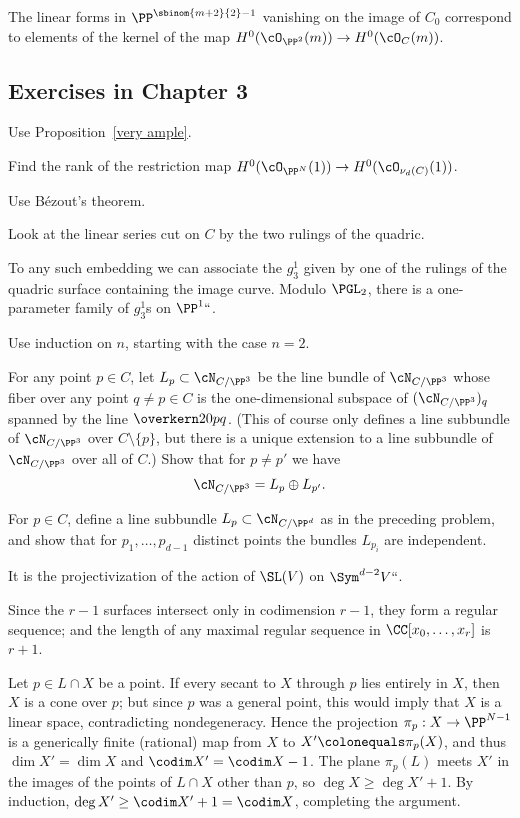 The linear forms in $\PP^{\sbinom{m+2}{2} - 1}$ vanishing on the image
of $C_0$ correspond to elements of the kernel of the map
$H^0(\cO_{\PP^2}(m)) \to H^0(\cO_{C}(m))$.

\subsection*{Exercises in Chapter 3}

Use Proposition~\ref{very ample}.

Find the rank of the restriction map
$H^0(\cO_{\PP^N}(1)) \to H^0(\cO_{\nu_d(C)}(1))$.

Use B\'ezout's theorem.
%

Look at the linear series cut on $C$ by the two rulings of the quadric.

To any such embedding we can associate the $g^1_3$ given by one of the
rulings of the quadric surface containing the image curve. Modulo
$\PGL_2$, there is a one-parameter family of $g^1_3$s on $\PP^1` `$.

 Use induction on $n$, starting with the case $n=2$.

 For any point $p \in C$, let $L_p \subset \cN_{C/\PP^3}$ be the
%
line bundle
of $\cN_{C/\PP^3}$ whose fiber over any point $q \neq p \in C$ is the
one-dimensional subspace of $(\cN_{C/\PP^3})_q$ spanned by the line
$\overkern20{pq}$. (This of course only defines a line subbundle of
$\cN_{C/\PP^3}$ over $C \setminus \{p\}$, but there is a unique
extension to a line subbundle of $\cN_{C/\PP^3}$ over all of $C$.)
Show that for $p \neq p'$ we have
$$
\cN_{C/\PP^3} = L_p \oplus L_{p'}.
$$

For $p \in C$, define a line subbundle $L_p \subset \cN_{C/\PP^d}$ as
in the preceding problem, and show that for $p_1,\dots,p_{d-1}$
distinct points the bundles $L_{p_i}$ are independent.

It is the projectivization of the action of $\SL(V)$ on $\Sym^{d-2}V` `$.

Since the $r-1$ surfaces intersect only in codimension $r-1$, they form
a regular sequence; and the length of any maximal regular sequence in
$\CC[x_0,\dots, x_r]$ is $r+1$.

 Let $p\in L\cap X$ be a point. If every secant to $X$ through
$p$ lies entirely in $X$, then $X$ is a cone over $p$; but since $p$
was a general point, this would imply that $X$ is a linear space,
contradicting nondegeneracy.
Hence
the projection $\pi_{p}:X \to \PP^{N-1}$ is a generically
finite (rational) map from $X$ to $X' \colonequals  \pi_{p}(X)$,
and thus $\dim X' = \dim X$ and $\codim X' = \codim X-1$. The plane
$\pi_{p}(L)$ meets $X'$ in the images of the points of $L\cap X$ other
than $p$, so
$\deg X\geq \deg X'+1$. By induction, $\deg X' \geq \codim X'+1 = \codim
X$, completing the argument.

